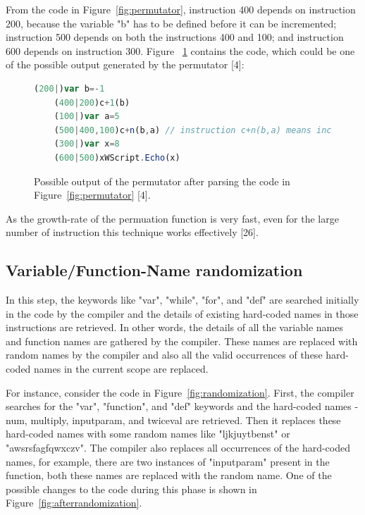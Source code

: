 From the code in Figure~\ref{fig:permutator}, instruction 400 depends on instruction 200, because the variable "b" has to be defined before it can be incremented; instruction 500 depends on both the instructions 400 and 100; and instruction 600 depends on instruction 300. Figure ~\ref{fig:afterpermutator} contains the code, which could be one of the possible output generated by the permutator [4]:

\begin{figure}
  \centering
  \begin{lstlisting}[language=JavaScript]
	(200|)var b=-1
	(400|200)c+1(b)
	(100|)var a=5	
	(500|400,100)c+n(b,a) // instruction c+n(b,a) means increasing b by a: i.e. b+=a
	(300|)var x=8
	(600|500)xWScript.Echo(x)
\end{lstlisting}
    \caption[Permutator output]{Possible output of the permutator after parsing the code in Figure~\ref{fig:permutator} [4].}
    \label{fig:afterpermutator}
\end{figure}

As the growth-rate of the permuation function is very fast, even for the large number of instruction this technique works effectively [26].

\subsection{Variable/Function-Name randomization}

In this step, the keywords like "var", "while", "for", and "def" are searched initially in the code by the compiler and the details of existing hard-coded names in those instructions are retrieved. In other words, the details of all the variable names and function names are gathered by the compiler. These names are replaced with random names by the compiler and also all the valid occurrences of these hard-coded names in the current scope are replaced.

For instance, consider the code in Figure~\ref{fig:randomization}. First, the compiler searches for the "var", "function", and "def" keywords and the hard-coded names - num, multiply, inputparam, and twiceval are retrieved. Then it replaces these hard-coded names with some random names like "ljkjuytbenst" or "awsrsfagfqwxczv". The compiler also replaces all occurrences of the hard-coded names, for example, there are two instances of "inputparam" present in the function, both these names are replaced with the random name. One of the possible changes to the code during this phase is shown in Figure~\ref{fig:afterrandomization}. 

